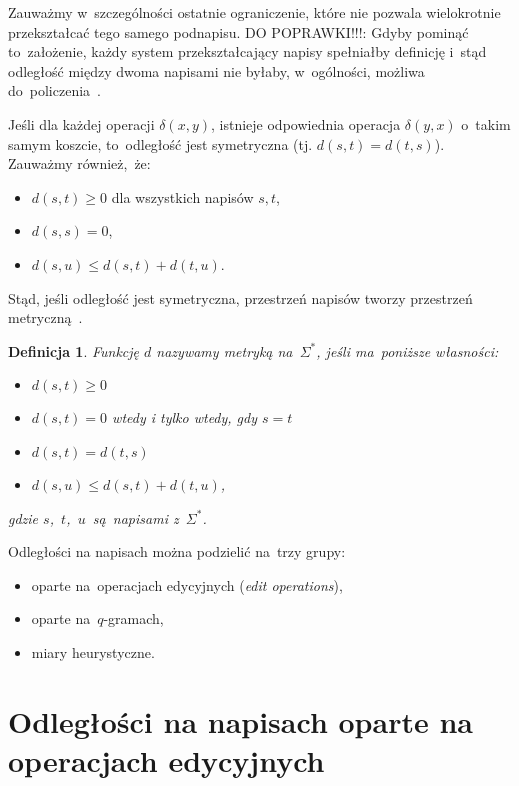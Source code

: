 \documentclass[12pt, twoside, openany]{report}
\theoremstyle{plain}
\newtheorem{defi}{Definicja}[section]
\begin{document}
Zauważmy w~szczególności ostatnie ograniczenie, które nie pozwala wielokrotnie przekształcać tego samego podnapisu. DO POPRAWKI!!!: Gdyby pominąć to~założenie, każdy system przekształcający napisy spełniałby definicję i~stąd odległość między dwoma napisami nie byłaby, w~ogólności, możliwa do~policzenia~\cite{Navarro2001:guidedtour}.

Jeśli dla każdej operacji $\delta(x,y)$, istnieje odpowiednia operacja $\delta(y,x)$ o~takim samym koszcie, to~odległość jest symetryczna (tj. $d(s,t) = d(t,s)$). Zauważmy również,~że:
\begin{itemize}
\item $d(s,t) \geq 0$ dla wszystkich napisów $s, t$,
\item $d(s,s) = 0$,
\item $d(s,u) \leq d(s,t) + d(t,u)$.
\end{itemize}
Stąd, jeśli odległość jest symetryczna, przestrzeń napisów tworzy przestrzeń metryczną~\cite{Navarro2001:guidedtour}.

\begin{defi}
Funkcję $d$ nazywamy \emph{metryką} na~$\Sigma^*$, jeśli ma~poniższe własności:
\begin{itemize}
\item $d(s,t) \geq 0$
\item $d(s,t) = 0$ wtedy i tylko wtedy, gdy $s = t$
\item $d(s,t) = d(t,s)$
\item $d(s,u) \leq d(s,t) + d(t,u)$,
\end{itemize}
gdzie $s$,~$t$,~$u$~są~napisami z~$\Sigma^*$.
\end{defi}



Odległości na napisach można podzielić na~trzy grupy:
\begin{itemize}
\item oparte na~operacjach edycyjnych (\emph{edit operations}),
\item oparte na~$q$-gramach,
\item miary heurystyczne.
\end{itemize}


\section{Odległości na napisach oparte na operacjach edycyjnych}
\end{document}
